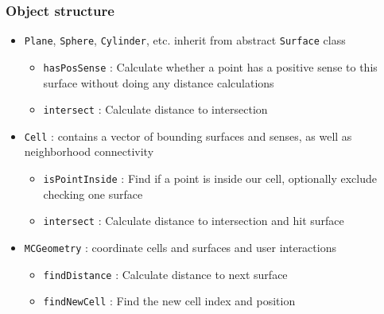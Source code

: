 \documentclass[color={usenames, dvipsnames},ignorenonframetext]{beamer}
\begin{document}
\begin{frame}
\frametitle{Object structure}
\begin{itemize}
  \item \texttt{Plane}, \texttt{Sphere},
        \texttt{Cylinder}, etc. inherit from abstract \texttt{Surface} class
    \begin{itemize}
      \item \texttt{hasPosSense}
        : Calculate whether a point has a positive sense to this
        surface without doing any distance calculations
      \item \texttt{intersect}
        : Calculate distance to intersection
    \end{itemize}
  \item \texttt{Cell} : contains a vector of bounding surfaces and senses, as
    well as neighborhood connectivity
    \begin{itemize}
      \item \texttt{isPointInside}
        : Find if a point is inside our cell, optionally exclude checking one
        surface
      \item \texttt{intersect}
        : Calculate distance to intersection and hit surface
    \end{itemize}
  \item \texttt{MCGeometry} : coordinate cells and surfaces and user
    interactions
    \begin{itemize}
      \item \texttt{findDistance}
        : Calculate distance to next surface
      \item \texttt{findNewCell}
        : Find the new cell index and position
    \end{itemize}
\end{itemize}
\end{frame}
\end{document}
